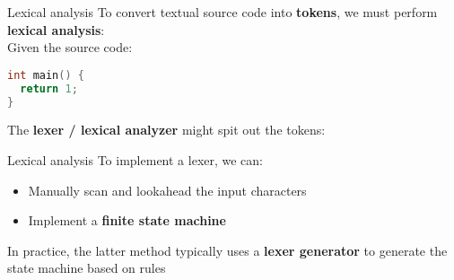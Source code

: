 \documentclass[../index.tex]{subfiles}
\begin{document}
\renewcommand{\currenttitle}{Lexical analysis}
\begin{frame}[fragile]{\currenttitle}
  To convert textual source code into \textbf{tokens}, we must perform
  \textbf{lexical analysis}: \\[1em]

  Given the source code: 

  \newcommand{\token}[2]{%
    {
      \scriptsize
      \begin{tabular}{|l |l |}
        \hline
        \textbf{#2} & #1 \\
        \hline
      \end{tabular}
    }
  }

  \begin{lstlisting}[language=C++,xleftmargin=1.5em]
int main() {
  return 1;
}
  \end{lstlisting}

  The \textbf{lexer / lexical analyzer} might spit out the tokens: \\[0.5em]

\end{frame}

\begin{frame}[fragile]{\currenttitle}
  To implement a lexer, we can:

  \begin{itemize}
    \item Manually scan and lookahead the input characters
    \item Implement a \textbf{finite state machine}
  \end{itemize}

  In practice, the latter method typically uses a \textbf{lexer generator} to
  generate the state machine based on rules
\end{frame}
\end{document}
